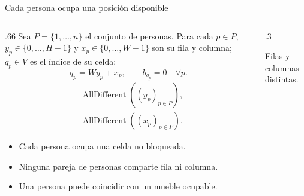 \documentclass[aspectratio=169,11pt]{beamer}
\newcommand{\examplegrid}{%
  \draw[step=1,ink!35] (0,0) grid (4,4);
  \draw[ink,thick] (0,0) rectangle (4,4);
}
\begin{document}
\begin{frame}{Cada persona ocupa una posici\'on disponible}
  \begin{columns}[T,onlytextwidth]
  \begin{column}{.66\textwidth}
  \small
  Sea \(P=\{1,\ldots,n\}\) el conjunto de personas.
  Para cada \(p\in P\), \(y_p\in\{0,\ldots,H-1\}\) y
  \(x_p\in\{0,\ldots,W-1\}\) son su fila y columna;
  \(q_p\in V\) es el \'indice de su celda:
  \[
    q_p=Wy_p+x_p,\qquad b_{q_p}=0\quad\forall p.
  \]
  \[
    \begin{aligned}
      &\operatorname{AllDifferent}((y_p)_{p\in P}),\\
      &\operatorname{AllDifferent}((x_p)_{p\in P}).
    \end{aligned}
  \]
  \begin{itemize}
    \setlength{\itemsep}{2mm}
    \item Cada persona ocupa una celda no bloqueada.
    \item Ninguna pareja de personas comparte fila ni columna.
    \item Una persona puede coincidir con un mueble ocupable.
  \end{itemize}
  \end{column}
  \begin{column}{.3\textwidth}
    \centering
    \par\smallskip\scriptsize Filas y columnas distintas.
  \end{column}
  \end{columns}
\end{frame}
\end{document}

